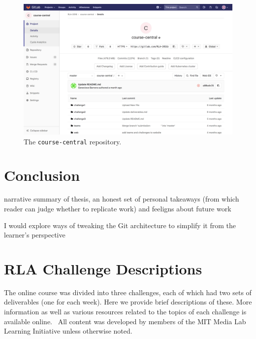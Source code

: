 \documentclass[12pt,twoside]{mitthesis}
\newcommand{\review}[1]{{\color{mygreen} #1}}
\begin{document}
\begin{figure}[H]
\centering
\includegraphics[scale=0.3]{fig-course-central.png}
\caption{The \texttt{course-central} repository.}
\end{figure}

\chapter{Conclusion}

\review{narrative summary of thesis, an honest set of personal takeaways (from which reader can judge whether to replicate work) and feeligns about future work

I would explore ways of tweaking the Git architecture to simplify it from the learner's perspective}

\appendix

\chapter{RLA Challenge Descriptions}

The online course was divided into three challenges, each of which had two sets of deliverables (one for each week). Here we provide brief descriptions of these. More information as well as various resources related to the topics of each challenge is available online.~\cite{rla} All content was developed by members of the MIT Media Lab Learning Initiative unless otherwise noted.
\end{document}
